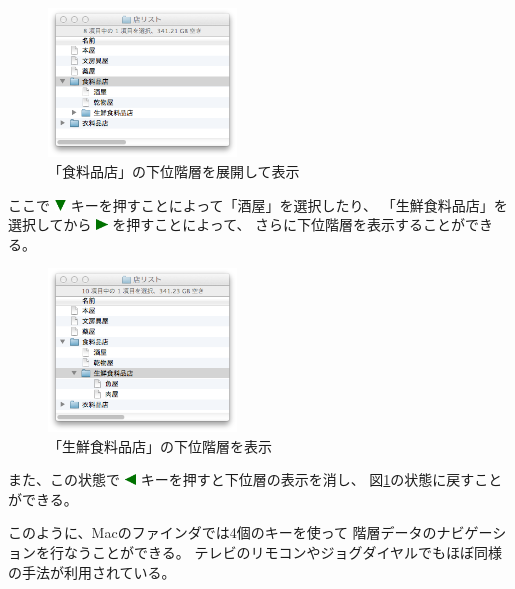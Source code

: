 \documentclass[twoside]{wiss}
\def\figwidth{50mm}
\def\down{ \includegraphics[width=3mm,bb=0 0 36 36]{figures/downtriangle.pdf} }
\def\right{ \includegraphics[width=3mm,bb=0 0 36 36]{figures/righttriangle.pdf} }
\def\left{ \includegraphics[width=3mm,bb=0 0 36 36]{figures/lefttriangle.pdf} }
\begin{document}
\begin{figure}[H]
\centerline{\includegraphics[width=\figwidth,bb=0 0 344 272]{figures/51d867d4721f65c18e84172c8818e137.png}}
\caption{「食料品店」の下位階層を展開して表示}
\label{screenshot5}
\end{figure}

\noindent
ここで{\down}キーを押すことによって「酒屋」を選択したり、
「生鮮食料品店」を選択してから{\right}を押すことによって、
さらに下位階層を表示することができる。

\begin{figure}[H]
\centerline{\includegraphics[width=\figwidth,bb=0 0 344 298]{figures/ce3ee682612de44d6c663a7323c262a6.png}}
\caption{「生鮮食料品店」の下位階層を表示}
\label{screenshot6}
\end{figure}

\noindent
また、この状態で{\left}キーを押すと下位層の表示を消し、
図\ref{screenshot5}の状態に戻すことができる。

このように、Macのファインダでは4個のキーを使って
階層データのナビゲーションを行なうことができる。
テレビのリモコンやジョグダイヤルでもほぼ同様の手法が利用されている。
\end{document}
